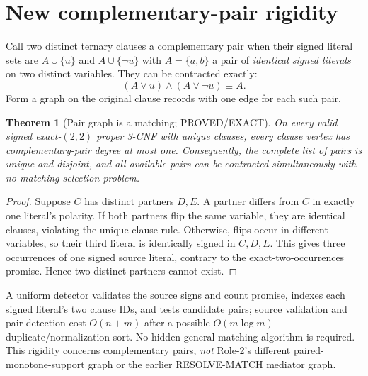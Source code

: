 \documentclass[11pt]{article}
\newtheorem{theorem}{Theorem}
\begin{document}
\section{New complementary-pair rigidity}
Call two distinct ternary clauses a complementary pair when their signed literal sets are $A\cup\{u\}$ and $A\cup\{\neg u\}$ with $A=\{a,b\}$ a pair of \emph{identical signed literals} on two distinct variables. They can be contracted exactly:
\[
(A\vee u)\wedge(A\vee\neg u)\equiv A.
\]
Form a graph on the original clause records with one edge for each such pair.
\begin{theorem}[Pair graph is a matching; PROVED/EXACT]
On every valid signed exact-$(2,2)$ proper 3-CNF with unique clauses, every clause vertex has complementary-pair degree at most one. Consequently, the complete list of pairs is unique and disjoint, and all available pairs can be contracted simultaneously with no matching-selection problem.
\end{theorem}
\begin{proof}
Suppose $C$ has distinct partners $D,E$. A partner differs from $C$ in exactly one literal's polarity. If both partners flip the same variable, they are identical clauses, violating the unique-clause rule. Otherwise, flips occur in different variables, so their third literal is identically signed in $C,D,E$. This gives three occurrences of one signed source literal, contrary to the exact-two-occurrences promise. Hence two distinct partners cannot exist.
\end{proof}
\par\noindent A uniform detector validates the source signs and count promise, indexes each signed literal's two clause IDs, and tests candidate pairs; source validation and pair detection cost $O(n+m)$ after a possible $O(m\log m)$ duplicate/normalization sort. No hidden general matching algorithm is required. This rigidity concerns complementary pairs, \emph{not} Role-2's different paired-monotone-support graph or the earlier RESOLVE-MATCH mediator graph.
\end{document}
